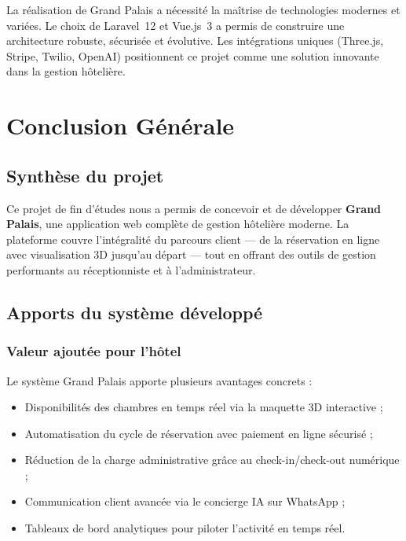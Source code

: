 \documentclass[12pt, a4paper]{report}
\begin{document}
La réalisation de Grand Palais a nécessité la maîtrise de technologies modernes et
variées. Le choix de Laravel~12 et Vue.js~3 a permis de construire une architecture
robuste, sécurisée et évolutive. Les intégrations uniques (Three.js, Stripe, Twilio,
OpenAI) positionnent ce projet comme une solution innovante dans la gestion hôtelière.

\chapter*{Conclusion Générale}

\section*{Synthèse du projet}

Ce projet de fin d'études nous a permis de concevoir et de développer \textbf{Grand Palais},
une application web complète de gestion hôtelière moderne. La plateforme couvre l'intégralité
du parcours client --- de la réservation en ligne avec visualisation 3D jusqu'au départ ---
tout en offrant des outils de gestion performants au réceptionniste et à l'administrateur.

\section*{Apports du système développé}

\subsection*{Valeur ajoutée pour l'hôtel}

Le système Grand Palais apporte plusieurs avantages concrets :
\begin{itemize}
  \item Disponibilités des chambres en temps réel via la maquette 3D interactive ;
  \item Automatisation du cycle de réservation avec paiement en ligne sécurisé ;
  \item Réduction de la charge administrative grâce au check-in/check-out numérique ;
  \item Communication client avancée via le concierge IA sur WhatsApp ;
  \item Tableaux de bord analytiques pour piloter l'activité en temps réel.
\end{itemize}
\end{document}
